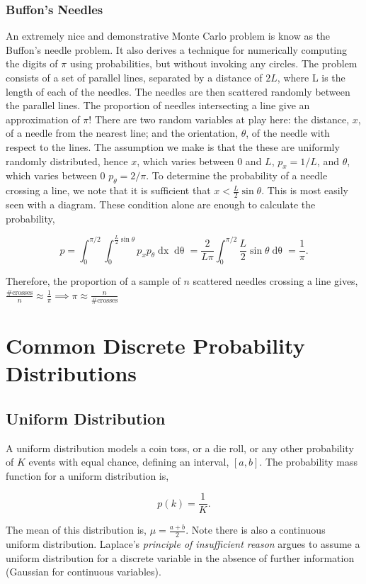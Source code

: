 \documentclass[11pt]{amsart}
\begin{document}
\subsubsection{Buffon's Needles}
An extremely nice and demonstrative Monte Carlo problem is know as the Buffon's needle problem. It also derives a technique for numerically computing the digits of $\pi$ using probabilities, but without invoking any circles. The problem consists of a set of parallel lines, separated by a distance of $2L$, where L is the length of each of the needles. The needles are then scattered randomly between the parallel lines. The proportion of needles intersecting a line give an approximation of $\pi$! There are two random variables at play here: the distance, $x$, of a needle from the nearest line; and the orientation, $\theta$, of the needle with respect to the lines. The assumption we make is that the these are uniformly randomly distributed, hence $x$, which varies between 0 and $L$, $p_x = 1/L$, and $\theta$, which varies between $0$ $p_{\theta} = 2/\pi$. To determine the probability of a needle crossing a line, we note that it is sufficient that $x < \frac{L}{2}\sin\theta$. This is most easily seen with a diagram. These condition alone are enough to calculate the probability,

$$
p = \int_{0}^{\pi/2}\int_{0}^{\frac{L}{2}\sin\theta}p_xp_{\theta}\mathop{dx}\mathop{d\theta} = \frac{2}{L\pi}\int_{0}^{\pi/2}\frac{L}{2}\sin\theta\mathop{d\theta} = \frac{1}{\pi}.
$$

Therefore, the proportion of a sample of $n$ scattered needles crossing a line gives, $\frac{\text{\# crosses}}{n} \approx \frac{1}{\pi} \implies \pi \approx \frac{n}{\text{\# crosses}}$

\section{Common Discrete Probability Distributions}

\subsection{Uniform Distribution}

A uniform distribution models a coin toss, or a die roll, or any other probability of $K$ events with equal chance, defining an interval, $[a, b]$. The probability mass function for a uniform distribution is,

$$p(k) = \frac{1}{K}.$$

The mean of this distribution is, $\mu = \frac{a + b}{2}$. Note there is also a continuous uniform distribution. Laplace's \emph{principle of insufficient reason} argues to assume a uniform distribution for a discrete variable in the absence of further information (Gaussian for continuous variables).
\end{document}
